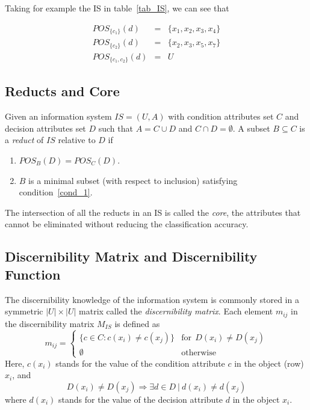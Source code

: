\documentclass[authoryear,11pt]{elsarticle}
\begin{document}
  Taking for example the IS in table~\ref{tab_IS}, we can see that
  
  $$\begin{array}{lcc}
  POS_{\lbrace c_1 \rbrace}(d)     &=& \lbrace x_1,x_2,x_3,x_4 \rbrace\\
  POS_{\lbrace c_2 \rbrace}(d)     &=& \lbrace x_2,x_3,x_5,x_7 \rbrace\\
  POS_{\lbrace c_1, c_2 \rbrace}(d)&=& U
  \end{array}$$
 
\subsection{Reducts and Core}
  Given an information system $IS=(U,A)$ with condition attributes set $C$ and decision attributes set
  $D$ such that $A=C \cup D$ and $C \cap D =\emptyset$. A subset $B \subseteq C$ is a \textit{reduct} 
  of $IS$ relative to $D$ if
  \begin{enumerate}
  	\item $POS_B(D)=POS_C(D)$. \label{cond_1}
  	\item $B$ is a minimal subset (with respect to inclusion) satisfying condition~\ref{cond_1}.
  \end{enumerate}
  
  The intersection of all the reducts in an IS is called the \textit{core}, the attributes that cannot be
  eliminated without reducing the classification accuracy.
  
\subsection{Discernibility Matrix and Discernibility Function}
  The discernibility knowledge of the information system is commonly stored in a symmetric $|U| \times |U|$
  matrix called the \textit{discernibility matrix}. Each element $m_{ij}$ in the discernibility matrix 
  $M_{IS}$ is defined as   
  \begin{equation}
  	m_{ij}=\left\lbrace\begin{array}{cl}
  			\lbrace c \in C: c(x_i) \neq c(x_j) \rbrace & \mathrm{for~~}D(x_i) \neq D(x_j)\\
  			\emptyset 								   & \mathrm{otherwise} 
  	\end{array}\right.
  \end{equation}  
  Here, $c(x_i)$ stands for the value of the condition attribute $c$ in the object (row) $x_i$, and 
  $$D(x_i) \neq D(x_j) \Rightarrow \exists d \in D~ |~ d(x_i) \neq d(x_j)$$ 
  where $d(x_i)$ stands for the value  of the decision attribute $d$ in the object $x_i$.
  
\end{document}
